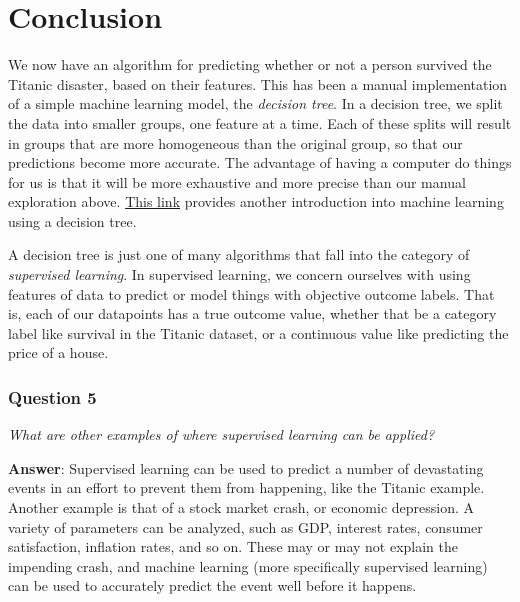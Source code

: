\documentclass{article}
\begin{document}
    \section{Conclusion}\label{conclusion}

We now have an algorithm for predicting whether or not a person survived
the Titanic disaster, based on their features. This has been a manual
implementation of a simple machine learning model, the \emph{decision
tree}. In a decision tree, we split the data into smaller groups, one
feature at a time. Each of these splits will result in groups that are
more homogeneous than the original group, so that our predictions become
more accurate. The advantage of having a computer do things for us is
that it will be more exhaustive and more precise than our manual
exploration above.
\href{http://www.r2d3.us/visual-intro-to-machine-learning-part-1/}{This
link} provides another introduction into machine learning using a
decision tree.

A decision tree is just one of many algorithms that fall into the
category of \emph{supervised learning}. In supervised learning, we
concern ourselves with using features of data to predict or model things
with objective outcome labels. That is, each of our datapoints has a
true outcome value, whether that be a category label like survival in
the Titanic dataset, or a continuous value like predicting the price of
a house.

\subsubsection{Question 5}\label{question-5}

\emph{What are other examples of where supervised learning can be
applied?}

    \textbf{Answer}: Supervised learning can be used to predict a number of
devastating events in an effort to prevent them from happening, like the
Titanic example. Another example is that of a stock market crash, or
economic depression. A variety of parameters can be analyzed, such as
GDP, interest rates, consumer satisfaction, inflation rates, and so on.
These may or may not explain the impending crash, and machine learning
(more specifically supervised learning) can be used to accurately
predict the event well before it happens.


    
    
    
    
\end{document}

